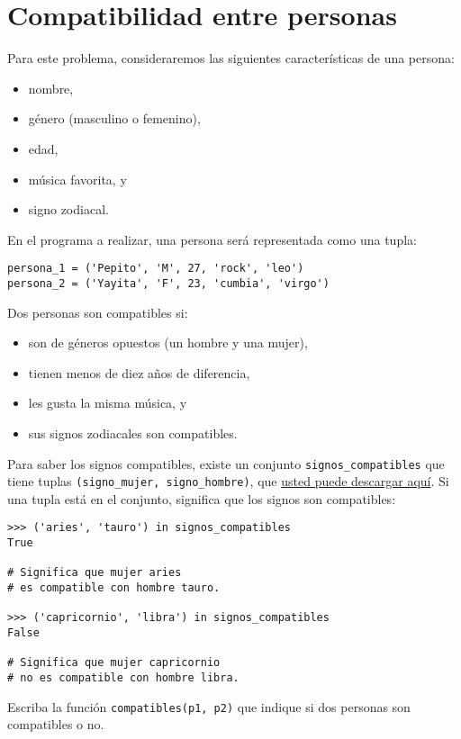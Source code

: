 \section{Compatibilidad entre personas}

Para este problema, consideraremos las siguientes características de una
persona:

\begin{itemize}
\item
  nombre,
\item
  género (masculino o femenino),
\item
  edad,
\item
  música favorita, y
\item
  signo zodiacal.
\end{itemize}

En el programa a realizar, una persona será representada como una tupla:

\begin{lstlisting}
persona_1 = ('Pepito', 'M', 27, 'rock', 'leo')
persona_2 = ('Yayita', 'F', 23, 'cumbia', 'virgo')
\end{lstlisting}

Dos personas son compatibles si:

\begin{itemize}
\item
  son de géneros opuestos (un hombre y una mujer),
\item
  tienen menos de diez años de diferencia,
\item
  les gusta la misma música, y
\item
  sus signos zodiacales son compatibles.
\end{itemize}

Para saber los signos compatibles, existe un conjunto
\lstinline!signos_compatibles! que tiene tuplas
\lstinline!(signo_mujer, signo_hombre)!, que
\href{../../\_static/signos.py}{usted puede descargar aquí}. Si una
tupla está en el conjunto, significa que los signos son compatibles:

\begin{lstlisting}
>>> ('aries', 'tauro') in signos_compatibles
True

# Significa que mujer aries
# es compatible con hombre tauro.

>>> ('capricornio', 'libra') in signos_compatibles
False

# Significa que mujer capricornio
# no es compatible con hombre libra.
\end{lstlisting}

Escriba la función \lstinline!compatibles(p1, p2)! que indique si dos
personas son compatibles o no.
